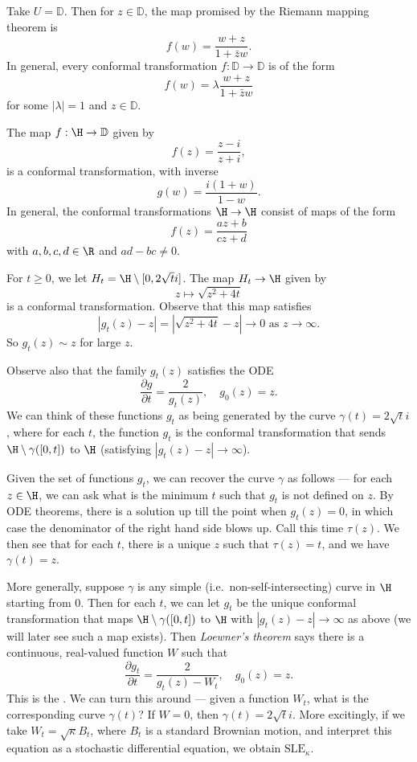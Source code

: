 \documentclass[a4paper]{article}
\renewcommand\D{\mathbb{D}}
\newcommand\SLE{\mathrm{SLE}}
\begin{document}
\begin{eg}
  Take $U = \D$. Then for $z \in \D$, the map promised by the Riemann mapping theorem is
  \[
    f(w) = \frac{w + z}{1 + \bar{z} w}.
  \]
  In general, every conformal transformation $f: \D \to \D$ is of the form
  \[
    f(w) = \lambda \frac{w + z}{1 + \bar{z}w}
  \]
  for some $|\lambda| = 1$ and $z \in \D$.
\end{eg}

\begin{eg}
  The map $f: \H \to \D$ given by
  \[
    f(z) = \frac{z - i}{z + i},
  \]
  is a conformal transformation, with inverse
  \[
    g(w) = \frac{i(1 + w)}{1 - w}.
  \]
  In general, the conformal transformations $\H \to \H$ consist of maps of the form
  \[
    f(z) = \frac{az + b}{c z + d}
  \]
  with $a, b, c, d \in \R$ and $ad - bc \not= 0$.
\end{eg}

\begin{eg}
  For $t \geq 0$, we let $H_t = \H \setminus [0, 2\sqrt{t} i]$. The map $H_t \to \H$ given by
  \[
    z \mapsto \sqrt{z^2 + 4t}
  \]
  is a conformal transformation. Observe that this map satisfies
  \[
    |g_t(z) - z| = |\sqrt{z^2 + 4t} - z| \to 0\text{ as } z \to \infty.
  \]
  So $g_t(z) \sim z$ for large $z$.

  Observe also that the family $g_t(z)$ satisfies the ODE
  \[
    \frac{\partial g}{\partial t} = \frac{2}{g_t(z)},\quad g_0(z) = z.
  \]
  We can think of these functions $g_t$ as being generated by the curve $\gamma(t) = 2 \sqrt{t}i$, where for each $t$, the function $g_t$ is the conformal transformation that sends $\H \setminus \gamma([0, t])$ to $\H$ (satisfying $|g_t(z) - z| \to \infty$).

  Given the set of functions $g_t$, we can recover the curve $\gamma$ as follows --- for each $z \in \H$, we can ask what is the minimum $t$ such that $g_t$ is not defined on $z$. By ODE theorems, there is a solution up till the point when $g_t(z) = 0$, in which case the denominator of the right hand side blows up. Call this time $\tau(z)$. We then see that for each $t$, there is a unique $z$ such that $\tau(z) = t$, and we have $\gamma(t) = z$.

  More generally, suppose $\gamma$ is any simple (i.e.\ non-self-intersecting) curve in $\H$ starting from $0$. Then for each $t$, we can let $g_t$ be the unique conformal transformation that maps $\H \setminus \gamma([0, t])$ to $\H$ with $|g_t(z) - z| \to \infty$ as above (we will later see such a map exists). Then \emph{Loewner's theorem} says there is a continuous, real-valued function $W$ such that
  \[
    \frac{\partial g_t}{\partial t} = \frac{2}{g_t(z) - W_t},\quad g_0(z) = z.
  \]
  This is the . We can turn this around --- given a function $W_t$, what is the corresponding curve $\gamma(t)$? If $W = 0$, then $\gamma(t) = 2\sqrt{t}i$. More excitingly, if we take $W_t = \sqrt{\kappa} B_t$, where $B_t$ is a standard Brownian motion, and interpret this equation as a stochastic differential equation, we obtain $\SLE_\kappa$.
\end{eg}
\end{document}
